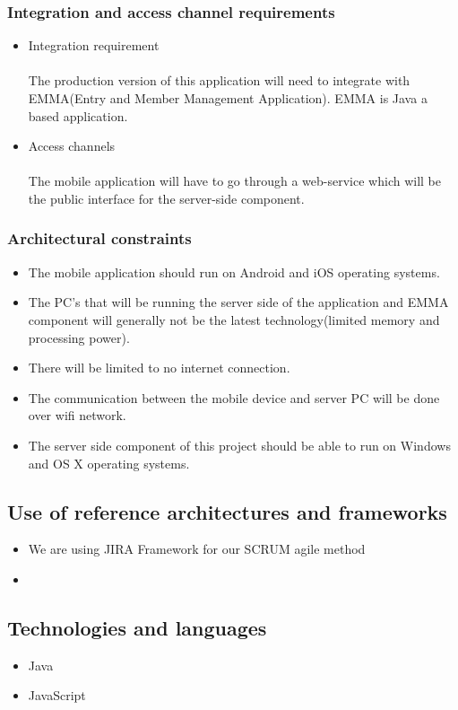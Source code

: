 \documentclass[10pt,a4paper]{article}
\begin{document}
\subsubsection{Integration and access channel requirements}
\begin{itemize}
\item Integration requirement
\paragraph{}
The production version of this application will need to integrate with EMMA(Entry and Member Management Application). EMMA is Java a based application.
\item Access channels
\paragraph{}
The mobile application will have to go through a web-service which will be the public interface for the server-side component. 
\end{itemize}
\subsubsection{Architectural constraints}
\begin{itemize}
\item The mobile application should run on Android and iOS operating systems.
\item The PC's that will be running the server side of the application and EMMA component will generally not be the latest technology(limited memory and processing power).
\item There will be limited to no internet connection.
\item The communication between the mobile device and server PC will be done over wifi network.
\item The server side component of this project should be able to run on Windows and OS X operating systems.
\end{itemize}
\subsection{Use of reference architectures and frameworks}
\begin{itemize}
\item We are using JIRA Framework for our SCRUM agile method
\item 
\end{itemize}
\subsection{Technologies and languages}
\begin{itemize}
\item Java
\item JavaScript
\end{itemize}
\end{document}
